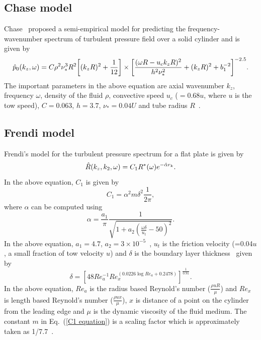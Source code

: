\documentclass[11pt,cleanfoot]{asme2ej}
\begin{document}
\subsection{Chase model}\label{Chase model}
Chase~\cite{Chase1981} proposed a semi-empirical model for predicting the frequency-wavenumber spectrum of turbulent pressure field over a solid cylinder and is given by
\begin{equation}\label{Turbulent pressure spectrum equation Chase}
        \Hat{p}_{0}(k_{z},\omega) = C\rho^{2}\nu_{*}^{3}R^2\biggl[(k_{z}R)^{2}+\frac{1}{12}\biggr]\times \biggl[\frac{(\omega R-u_{c}k_{z}R)^{2}}{h^{2}\nu_{*}^{2}}+(k_{z}R)^{2}+b_1^{-2}\biggr]^{-2.5}.
\end{equation}
The important parameters in the above equation are axial wavenumber $k_{z}$, frequency $\omega$, density of the fluid $\rho$, convective speed $u_{c}$ ($=0.68u$, where $u$ is the tow speed), $C=0.063$, $h=3.7$, $\nu_{*}=0.04U$ and tube radius $R$~\cite{Chase1981, carpenter1983, knight1996, KUTTANCHANDRIKA2014, Huang2020}.

\subsection{Frendi model}
\label{Frendi model}
Frendi's model for the turbulent pressure spectrum for a flat plate is given by \cite{frendi2020}
\begin{equation}\label{Pressure spectrum equation from Frendi}
    \Hat{R}(k_{z},k_{2},\omega) = C_{1}R^{*}(\omega)e^{-\Hat{\alpha}r_{k}}.
\end{equation}
In the above equation, $C_{1}$ is given by
\begin{equation}\label{C1 equation}
C_{1} = \alpha^{2}m\delta^{2}\frac{1}{2\pi},   
\end{equation}
where $\alpha$ can be computed using
\begin{equation}\label{alpha equation}
   \alpha = \frac{a_1}{\pi}\frac{1}{\sqrt{1+a_2(\frac{\omega \delta}{u_{t}}-50)^{2}}}.
\end{equation}
In the above equation, $a_1=4.7$, $a_2=3\times10^{-5}$~\cite{frendi2020}, $u_{t}$ is the friction velocity (=0.04$u$, a small fraction of tow velocity $u$) and $\delta$ is the boundary layer thickness~\cite{Jordan2014} given by
\begin{equation}\label{boundary layer thickness}
    \delta = [48Re_a^{-1}Re_x^{(0.0226\log{Re_a}+0.2478)}]^{\frac{1}{0.91}}.
\end{equation}
In the above equation, $Re_a$ is the radius based Reynold's number ($\frac{\rho u R}{\mu}$) and $Re_x$ is length based Reynold's number ($\frac{\rho u x}{\mu}$), $x$ is distance of a point on the cylinder from the leading edge and $\mu$ is the dynamic viscosity of the fluid medium. The constant $m$ in Eq.~(\ref{C1 equation}) is a scaling factor which is approximately taken as 1/7.7~\cite{frendi2020}. 
\end{document}

